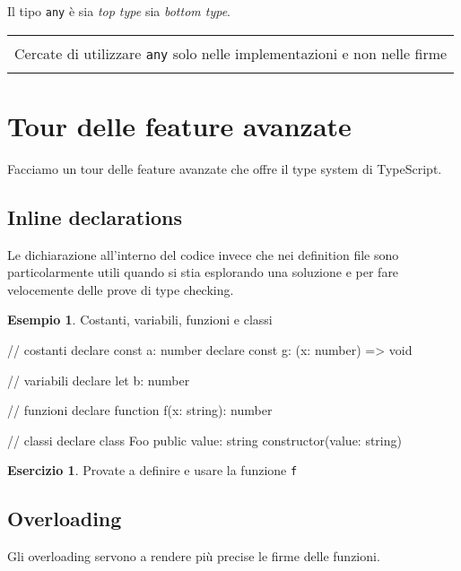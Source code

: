 \documentclass[12pt]{article}
\theoremstyle{definition}
\newtheorem{example}{Esempio}[subsection]
\newtheorem{exercise}{Esercizio}[subsection]
\newenvironment{boxed}
    {\begin{center}
    \begin{tabular}{|p{0.9\textwidth}|}
    \hline\\
    }
    {
    \\\\\hline
    \end{tabular}
    \end{center}
    }
\newenvironment{code}
  {\vspace{0.5cm} \VerbatimEnvironment\begin{typescriptcode}}
  {\end{typescriptcode} \vspace{0.2cm}}
\begin{document}
Il tipo \texttt{any} è sia \emph{top type} sia \emph{bottom type}.

\begin{boxed}
Cercate di utilizzare \texttt{any} solo nelle implementazioni e non nelle firme
\end{boxed}

\newpage

\section{Tour delle feature avanzate}

Facciamo un tour delle feature avanzate che offre il type system di TypeScript.

\subsection{Inline declarations}

Le dichiarazione all'interno del codice invece che nei definition file sono particolarmente utili quando si stia esplorando
una soluzione e per fare velocemente delle prove di type checking.

\begin{example}
Costanti, variabili, funzioni e classi

\begin{code}
// costanti
declare const a: number
declare const g: (x: number) => void

// variabili
declare let b: number

// funzioni
declare function f(x: string): number

// classi
declare class Foo {
  public value: string
  constructor(value: string)
}
\end{code}
\end{example}

\begin{exercise}
Provate a definire e usare la funzione \texttt{f}
\end{exercise}

\subsection{Overloading}

Gli overloading servono a rendere più precise le firme delle funzioni.
\end{document}
